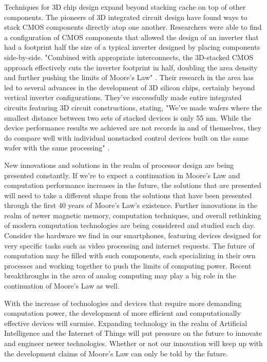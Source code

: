 \documentclass[12pt]{article}
\begin{document}
\begin{flushleft}
Techniques for 3D chip design expand beyond stacking
cache on top of other components. The pioneers of 3D
integrated circuit design have found ways to stack
CMOS components directly atop one another. Researchers
were able to find a configuration of CMOS components
that allowed the design of an inverter that had a footprint
half the size of a typical inverter designed by placing
components side-by-side. "Combined with appropriate
interconnects, the 3D-stacked CMOS approach effectively
cuts the inverter footprint in half, doubling the area
density and further pushing the limits of Moore's Law"
\parencite{9976473}. Their research in the area has
led to several advances in the development of 3D silicon
chips, certainly beyond vertical inverter configurations.
They've successfully made entire integrated circuits
featuring 3D circuit constructions, stating, "We've
made wafers where the smallest distance between two
sets of stacked devices is only 55 nm. While the device
performance results we achieved are not records in
and of themselves, they do compare well with individual
nonstacked control devices built on the same wafer
with the same processing" \parencite{9976473}.

New innovations and solutions in the realm of processor
design are being presented constantly. If we're to
expect a continuation in Moore's Law and computation
performance increases in the future, the solutions
that are presented will need to take a different shape
from the solutions that have been presented through
the first 40 years of Moore's Law's existence. Further
innovations in the realm of newer magnetic memory,
computation techniques, and overall rethinking of modern
computation technologies are being considered and studied
each day. Consider the hardware we find in our smartphones,
featuring devices designed for very specific tasks
such as video processing and internet requests. The
future of computation may be filled with such components,
each specializing in their own processes and working
together to push the limits of computing power. Recent
breakthroughs in the area of analog computing may play
a big role in the continuation of Moore's Law as well.

With the increase of technologies and devices that
require more demanding computation power, the development
of more efficient and computationally effective devices
will surmise. Expanding technology in the realm of
Artificial Intelligence and the Internet of Things
will put pressure on the future to innovate and engineer
newer technologies. Whether or not our innovation will
keep up with the development claims of Moore's Law
can only be told by the future.



\newpage


\newpage
\nocite{*}
\printbibliography

\end{flushleft}
\end{document}
